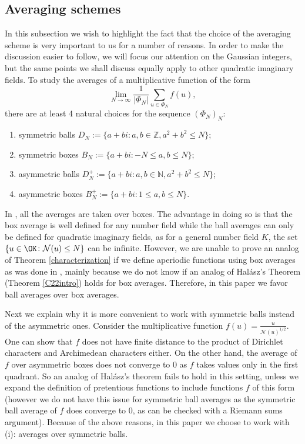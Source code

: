 \documentclass[11pt]{amsart}
\theoremstyle{definition}
\newcommand{\N}{{\mathbb N}}
\newcommand{\NN}{{\mathcal N}}
\newcommand{\Z}{{\mathbb Z}}
\begin{document}
\subsection{Averaging schemes}\label{s:as}
In this subsection we wish to highlight the fact that the choice of the averaging scheme is very important to us for a number of reasons. 
In order to make the discussion easier to follow, we will focus our attention on the Gaussian integers, but the same points we shall discuss equally apply to other quadratic imaginary fields. 
To study the averages of a multiplicative function of the form
$$\lim_{N\to\infty}\frac{1}{\vert\Phi_{N}\vert}\sum_{u\in\Phi_{N}}f(u),$$
there are at least 4 natural choices for the sequence $(\Phi_{N})_{N}$:
\begin{enumerate}
    \item   symmetric  balls $D_{N}:=\{a+bi\colon a,b\in\Z, a^{2}+b^{2}\leq N\}$;
    \item   symmetric boxes $B_{N}:=\{a+bi \colon -N\leq a,b\leq N\}$;
     \item  asymmetric  balls $D_{N}^{+}:=\{a+bi\colon a,b\in\N, a^{2}+b^{2}\leq N\}$;
    \item   asymmetric boxes $B_{N}^{+}:=\{a+bi \colon 1\leq a,b\leq N\}$.
\end{enumerate}


In \cite{S18,S23}, all the averages are taken over boxes. The  advantage  in doing so  is that the box average is well defined for any number field while the ball averages can only be defined for quadratic imaginary fields, as for a general number field $K$, the set $\{u\in\OK\colon \NN(u)\leq N\}$ can be infinite. However,  we are unable to prove an analog of Theorem \ref{characterization} if we define aperiodic functions using box averages as was done in \cite{S18,S23}, mainly because we do not know if an analog of Hal\'asz's Theorem (Theorem \ref{C22intro}) holds for box averages. Therefore, in this paper we favor ball averages over box averages.

Next we explain why it is more convenient to work with symmetric balls instead of the asymmetric ones. Consider the multiplicative function $f(u)=\frac{u}{\NN(u)^{1/2}}$. One can show that $f$ does not have finite distance to the product of Dirichlet characters and Archimedean characters either.  On the other hand, 
the average of $f$ over asymmetric boxes does not converge to 0 as $f$ takes values only in the first quadrant. So an analog of Hal\'asz's theorem fails to hold in this setting, unless we expand the definition of pretentious functions to include functions $f$ of this form (however we do not have this issue for symmetric ball averages as the symmetric ball average of $f$ does converge to 0, as can be checked with a Riemann sums argument).
Because of the above reasons, in this paper we choose to work with (i): averages over symmetric balls.
\end{document}
